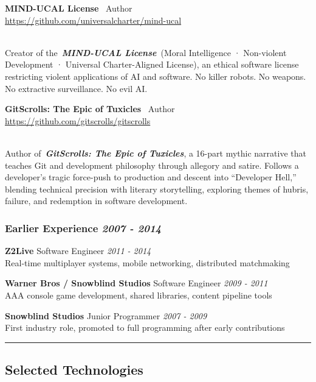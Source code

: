\documentclass[
]{article}
\begin{document}
\textbf{MIND-UCAL License}~\textbar{} Author\\
\url{https://github.com/universalcharter/mind-ucal}\strut \\
Creator of the~\textbf{\emph{MIND-UCAL License}}~(Moral Intelligence ·
Non-violent Development · Universal Charter-Aligned License), an ethical
software license restricting violent applications of AI and software. No
killer robots. No weapons. No extractive surveillance. No evil AI.

\textbf{GitScrolls: The Epic of Tuxicles}~\textbar{} Author\\
\url{https://github.com/gitscrolls/gitscrolls}\strut \\
Author of~\textbf{\emph{GitScrolls: The Epic of Tuxicles}}, a 16-part
mythic narrative that teaches Git and development philosophy through
allegory and satire. Follows a developer's tragic force-push to
production and descent into ``Developer Hell,'' blending technical
precision with literary storytelling, exploring themes of hubris,
failure, and redemption in software development.

\subsubsection{\texorpdfstring{\textbf{Earlier Experience} \textbar{}
\emph{2007 -
2014}}{Earlier Experience \textbar{} 2007 - 2014}}\label{earlier-experience-2007---2014}

\textbf{Z2Live} \textbar{} Software Engineer \textbar{} \emph{2011 -
2014}\\
Real-time multiplayer systems, mobile networking, distributed
matchmaking

\textbf{Warner Bros / Snowblind Studios} \textbar{} Software Engineer
\textbar{} \emph{2009 - 2011}\\
AAA console game development, shared libraries, content pipeline tools

\textbf{Snowblind Studios} \textbar{} Junior Programmer \textbar{}
\emph{2007 - 2009}\\
First industry role, promoted to full programming after early
contributions

\begin{center}\rule{0.5\linewidth}{0.5pt}\end{center}

\subsection{Selected Technologies}\label{selected-technologies}
\end{document}

